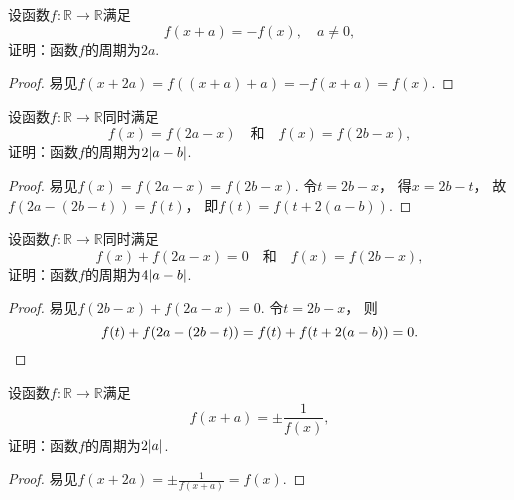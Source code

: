 \begin{example}
设函数\(f\colon\mathbb{R}\to\mathbb{R}\)满足\[
	f(x+a) = -f(x),
	\quad a\neq0,
\]
证明：函数\(f\)的周期为\(2a\).
\begin{proof}
易见\(f(x+2a)
=f((x+a)+a)
=-f(x+a)
=f(x)\).
\end{proof}
\end{example}

\begin{example}
设函数\(f\colon\mathbb{R}\to\mathbb{R}\)同时满足\[
	f(x)=f(2a-x)
	\quad\text{和}\quad
	f(x)=f(2b-x),
\]
证明：函数\(f\)的周期为\(2\abs{a-b}\).
\begin{proof}
易见\(f(x)
=f(2a-x)
=f(2b-x)\).
令\(t=2b-x\)，
得\(x=2b-t\)，
故\(f(2a-(2b-t))=f(t)\)，
即\(f(t)=f(t+2(a-b))\).
\end{proof}
\end{example}

\begin{example}
设函数\(f\colon\mathbb{R}\to\mathbb{R}\)同时满足\[
	f(x)+f(2a-x)=0
	\quad\text{和}\quad
	f(x)=f(2b-x),
\]
证明：函数\(f\)的周期为\(4\abs{a-b}\).
\begin{proof}
易见\(f(2b-x)+f(2a-x)=0\).
令\(t=2b-x\)，
则\[
	f(t)+f(2a-(2b-t))
	=f(t)+f(t+2(a-b))
	=0.
	\qedhere
\]
\end{proof}
\end{example}

\begin{example}
设函数\(f\colon\mathbb{R}\to\mathbb{R}\)满足\[
	f(x+a)=\pm\frac1{f(x)},
\]
证明：函数\(f\)的周期为\(2\abs{a}\).
\begin{proof}
易见\(f(x+2a)=\pm\frac1{f(x+a)}=f(x)\).
\end{proof}
\end{example}
